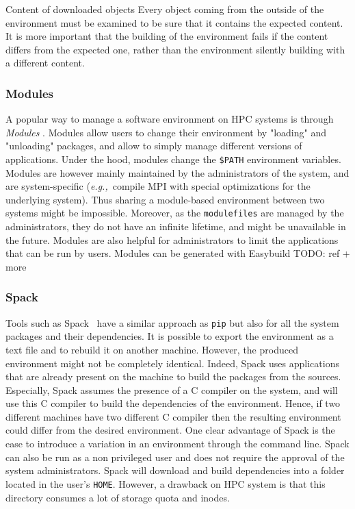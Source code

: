 \documentclass[sigconf,natbib=false]{acmart}
\newcommand{\eg}{\emph{e.g.,}}
\newcommand{\todo}[1]{{\color{red}TODO: #1}}
\begin{document}
\begin{lesson}{Content of downloaded objects}{}
Every object coming from the outside of the environment must be examined to be sure that it contains the expected content. 
It is more important that the building of the environment fails if the content differs from the expected one, rather than the environment silently building with a different content.
\end{lesson}

\subsubsection{Modules}

A popular way to manage a software environment on HPC systems is through \emph{Modules} \cite{modules}.
Modules allow users to change their environment by "loading" and "unloading" packages, and allow to simply manage different versions of applications. 
Under the hood, modules change the \texttt{\$PATH} environment variables.
Modules are however mainly maintained by the administrators of the system, and are system-specific (\eg\ compile MPI with special optimizations for the underlying system).
Thus sharing a module-based environment between two systems might be impossible.
Moreover, as the \texttt{modulefiles} are managed by the administrators, they do not have an infinite lifetime, and might be unavailable in the future.
Modules are also helpful for administrators to limit the applications that can be run by users.
Modules can be generated with Easybuild \todo{ref + more}

\subsubsection{Spack}

Tools such as Spack\ \cite{gamblin_spack_2015} have a similar approach as \texttt{pip} but also for all the system packages and their dependencies.
It is possible to export the environment as a text file and to rebuild it on another machine.
However, the produced environment might not be completely identical.
Indeed, Spack uses applications that are already present on the machine to build the packages from the sources.
Especially, Spack assumes the presence of a C compiler on the system, and will use this C compiler to build the dependencies of the environment.
Hence, if two different machines have two different C compiler then the resulting environment could differ from the desired environment.
One clear advantage of Spack is the ease to introduce a variation in an environment through the command line.
Spack can also be run as a non privileged user and does not require the approval of the system administrators.
Spack will download and build dependencies into a folder located in the user's \texttt{HOME}.
However, a drawback on HPC system is that this directory consumes a lot of storage quota and inodes.
\end{document}
